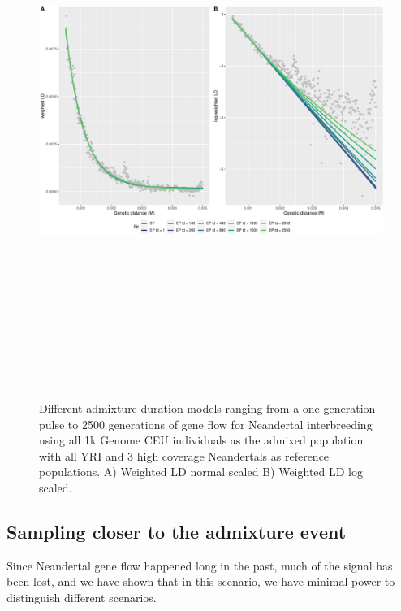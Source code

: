 \documentclass[11pt]{article}
\begin{document}
\begin{figure}
\centering
\includegraphics[width=16cm,height=18cm,keepaspectratio]{ATE_Revisions_files/figure-latex/fig5_Real_data-1.pdf}
\caption{\label{fig:fig5} Different admixture duration models ranging
from a one generation pulse to 2500 generations of gene flow for Neandertal interbreeding using all 1k Genome CEU individuals as the admixed population
with all YRI and 3 high coverage Neandertals as reference populations. A) Weighted LD normal scaled B) Weighted LD log scaled.}
\end{figure}

\subsection{Sampling closer to the admixture event}\label{estimating the Lomax-parameters under different conditions}

Since Neandertal gene flow happened long in the past, much of the signal has been lost, and we have shown that in this scenario, we have minimal power to distinguish different scenarios.
\end{document}
